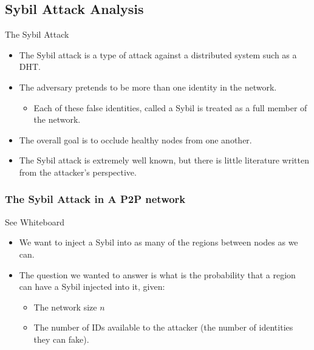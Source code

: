 \documentclass[11pt]{beamer}
\begin{document}
\subsection{Sybil Attack Analysis}

\begin{frame}{The Sybil Attack}
	\begin{itemize}
		\item The Sybil attack is a type of attack against a distributed system such as a DHT.
		\item The adversary pretends to be more than one identity in the network.
		\begin{itemize}
			\item Each of these false identities, called a \alert{Sybil} is treated as a full member of the network.
		\end{itemize}
		\item The overall goal is to occlude healthy nodes from one another.
		\item The Sybil attack is extremely well known, but there is little literature written from the attacker's perspective.
	\end{itemize}
	
\end{frame}



\begin{frame}
	\frametitle{The Sybil Attack in A P2P network}
	See Whiteboard
	\begin{itemize}
		\item We want to inject a Sybil into as many of the regions between nodes as we can.
		\item The question we wanted to answer is what is the probability that a region can have a Sybil injected into it, given:
		\begin{itemize}
			\item The network size $n$
			\item The number of IDs available to the attacker (the number of identities they can fake).
		\end{itemize}
	\end{itemize}
	\end{frame} 
       
\end{document}
